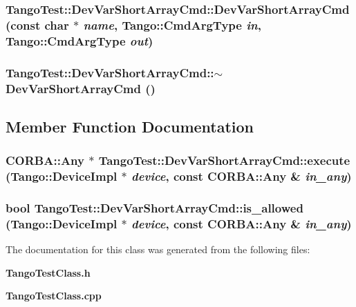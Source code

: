 \subsubsection{\setlength{\rightskip}{0pt plus 5cm}Tango\-Test::Dev\-Var\-Short\-Array\-Cmd::Dev\-Var\-Short\-Array\-Cmd (const char $\ast$ {\em name}, Tango::Cmd\-Arg\-Type {\em in}, Tango::Cmd\-Arg\-Type {\em out})}\label{classTangoTest_1_1DevVarShortArrayCmd_a1}


\subsubsection{\setlength{\rightskip}{0pt plus 5cm}Tango\-Test::Dev\-Var\-Short\-Array\-Cmd::$\sim$Dev\-Var\-Short\-Array\-Cmd ()\hspace{0.3cm}{\tt  [inline]}}\label{classTangoTest_1_1DevVarShortArrayCmd_a2}




\subsection{Member Function Documentation}
\subsubsection{\setlength{\rightskip}{0pt plus 5cm}CORBA::Any $\ast$ Tango\-Test::Dev\-Var\-Short\-Array\-Cmd::execute (Tango::Device\-Impl $\ast$ {\em device}, const CORBA::Any \& {\em in\_\-any})\hspace{0.3cm}{\tt  [virtual]}}\label{classTangoTest_1_1DevVarShortArrayCmd_a4}


\subsubsection{\setlength{\rightskip}{0pt plus 5cm}bool Tango\-Test::Dev\-Var\-Short\-Array\-Cmd::is\_\-allowed (Tango::Device\-Impl $\ast$ {\em device}, const CORBA::Any \& {\em in\_\-any})\hspace{0.3cm}{\tt  [virtual]}}\label{classTangoTest_1_1DevVarShortArrayCmd_a3}




The documentation for this class was generated from the following files:\begin{CompactItemize}
\item 
{\bf Tango\-Test\-Class.h}\item 
{\bf Tango\-Test\-Class.cpp}\end{CompactItemize}
